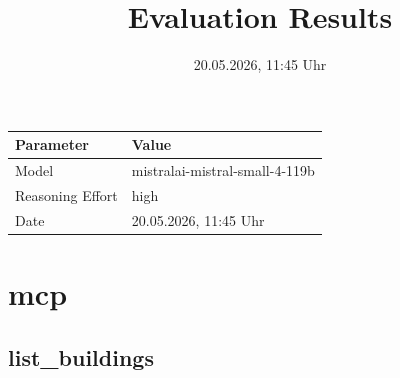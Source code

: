 \documentclass[a4paper,11pt]{article}
\title{Evaluation Results}
\date{20.05.2026, 11:45 Uhr}
\begin{document}
\maketitle

\begin{table}[H]
\centering
\begin{tabular}{l l}
\toprule
\textbf{Parameter} & \textbf{Value} \\
\midrule
Model & mistralai-mistral-small-4-119b \\
Reasoning Effort & high \\
Date & 20.05.2026, 11:45 Uhr \\
\bottomrule
\end{tabular}
\end{table}

\tableofcontents
\clearpage

\section{mcp}

\subsection{list\_buildings}
\end{document}
